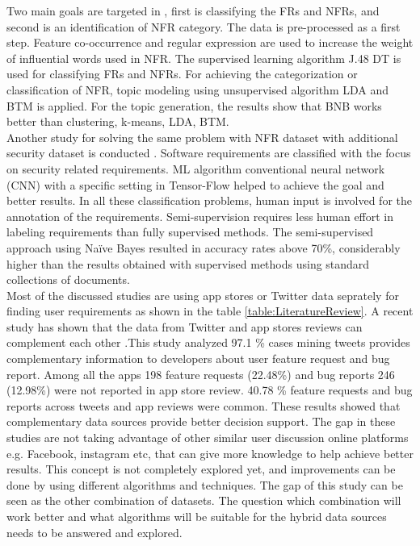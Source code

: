 	Two main goals are targeted in \cite{Abad},
first is classifying the FRs and NFRs, and second is an identification of NFR category. The data is
pre-processed as a first step. Feature co-occurrence and regular expression are used to increase
the weight of influential words used in NFR. The supervised learning algorithm J.48 DT is used
for classifying FRs and NFRs. For achieving the categorization or classification of NFR,
topic modeling using unsupervised algorithm LDA and BTM is applied. For the topic generation, the results show  that BNB works better than clustering, k-means, LDA, BTM. \\


	Another study for solving the same problem with NFR dataset with additional security dataset is conducted \cite{Dekhtyar}.
Software requirements are classified with the focus on security related requirements. ML algorithm
conventional neural network (CNN) with a specific setting in Tensor-Flow helped to achieve the goal and better results. In all
these classification problems, human input is involved for the annotation of the requirements.
Semi-supervision requires less human effort in labeling requirements than fully supervised
methods. The semi-supervised approach \cite{Casamayor} using Naïve Bayes resulted in accuracy rates
above 70\%, considerably higher than the results obtained with supervised methods using
standard collections of documents.\\

	 Most of the discussed studies are using app stores or Twitter data seprately for finding user requirements as shown in the table \ref{table:LiteratureReview}. A recent study has shown that the data from Twitter and app
stores reviews can complement each other \cite{Nayebi}.This study analyzed  97.1 \% cases mining tweets provides complementary information to developers about user 
feature request and bug report. Among all the apps 198 feature requests (22.48\%) and bug reports 246 (12.98\%) were not reported in app store review. 
40.78 \% feature requests and bug reports across tweets and app reviews were common. These results showed that complementary data sources 
provide better decision support. The gap in these studies are not taking advantage of other
similar user discussion online platforms e.g. Facebook, instagram etc, that can give more knowledge to help achieve better results. 
This concept is not completely explored yet, and improvements can be done by using different
algorithms and techniques. The gap of this study can be seen as the other combination of datasets. The question which combination will work better and what algorithms will be suitable for the hybrid data sources needs to be answered and explored. \\

